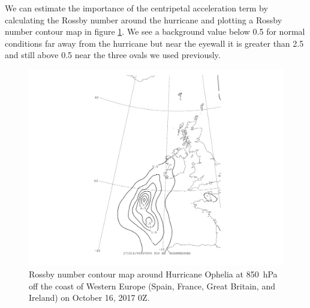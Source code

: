 \documentclass[11pt]{article}
\begin{document}
We can estimate the importance of the centripetal acceleration term by calculating the Rossby number around the hurricane and plotting a Rossby number contour map in figure \ref{fig:ophelia_rossby}. We see a background value below 0.5 for normal conditions far away from the hurricane but near the eyewall it is greater than 2.5 and still above 0.5 near the three ovals we used previously.

\begin{figure}[h!]
	\centering
	\includegraphics[trim={3.5cm 1cm 3.5cm 0},clip,width=\textwidth]{850hPa_rossby_ophelia}
	\caption{Rossby number contour map around Hurricane Ophelia at \SI{850}{\hecto\Pa} off the coast of Western Europe (Spain, France, Great Britain, and Ireland) on October 16, 2017 0Z.}
	\label{fig:ophelia_rossby}
\end{figure}

\end{document}
